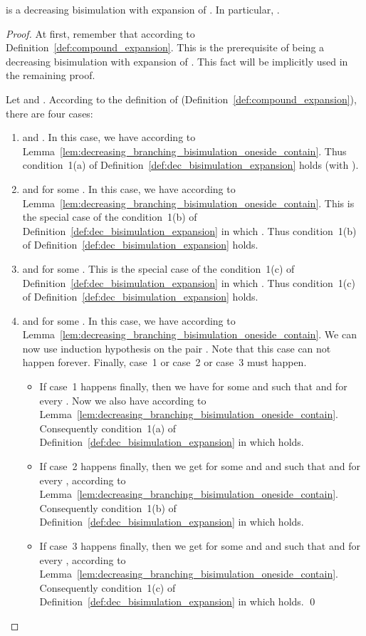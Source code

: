 \documentclass{llncs}
\begin{document}
\begin{lemma}\label{lem:decreasing_branching_bisimulation_twoside_contain}
 is a decreasing bisimulation with expansion of . In particular, .
\end{lemma}

\begin{proof}
At first, remember that   according to Definition~\ref{def:compound_expansion}. This is the prerequisite of  being a decreasing bisimulation with expansion of .   This fact will be implicitly used in the remaining proof.

Let  and .    According to the definition of  (Definition~\ref{def:compound_expansion}), there are four cases:
 \begin{enumerate}
 \item
   and .  In this case,  we have  according to Lemma~\ref{lem:decreasing_branching_bisimulation_oneside_contain}. Thus condition~1(a) of Definition~\ref{def:dec_bisimulation_expansion} holds (with ).

  \item
   and   for some . In this case, we have   according to  Lemma~\ref{lem:decreasing_branching_bisimulation_oneside_contain}. This is the special case of the condition~1(b) of Definition~\ref{def:dec_bisimulation_expansion} in which . Thus condition~1(b) of Definition~\ref{def:dec_bisimulation_expansion} holds.

  \item
   and   for some . This is the special case of the condition~1(c) of Definition~\ref{def:dec_bisimulation_expansion} in which . Thus condition~1(c) of Definition~\ref{def:dec_bisimulation_expansion} holds.


  \item
   and   for some . In this case, we have   according to  Lemma~\ref{lem:decreasing_branching_bisimulation_oneside_contain}.  We can now use induction hypothesis on the pair .  Note that this case can not happen forever.  Finally, case~1 or case~2 or case~3 must happen.
   \begin{itemize}
    \item
   If case~1 happens finally, then we have  for some  and   such that  and  for every .  Now we also have  according to  Lemma~\ref{lem:decreasing_branching_bisimulation_oneside_contain}.
   Consequently condition~1(a) of Definition~\ref{def:dec_bisimulation_expansion} in which  holds.

  \item
   If case~2 happens finally, then we get  for some  and  and  such that  and  for every , according to  Lemma~\ref{lem:decreasing_branching_bisimulation_oneside_contain}.
   Consequently condition~1(b) of Definition~\ref{def:dec_bisimulation_expansion} in which  holds.

 \item
    If case~3 happens finally, then we get  for some  and  and  such that  and  for every , according to  Lemma~\ref{lem:decreasing_branching_bisimulation_oneside_contain}.
   Consequently condition~1(c) of Definition~\ref{def:dec_bisimulation_expansion} in which  holds. \qed
  \end{itemize}
\end{enumerate}
\end{proof}
\end{document}
